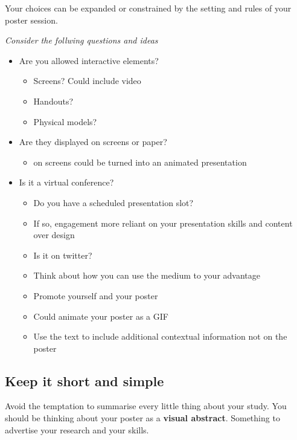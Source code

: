 \documentclass[
]{book}
\providecommand{\tightlist}{%
  \setlength{\itemsep}{0pt}\setlength{\parskip}{0pt}}
\begin{document}
Your choices can be expanded or constrained by the setting and rules of your poster session.

\emph{Consider the follwing questions and ideas}

\begin{itemize}
\tightlist
\item
  Are you allowed interactive elements?

  \begin{itemize}
  \tightlist
  \item
    Screens? Could include video
  \item
    Handouts?
  \item
    Physical models?
  \end{itemize}
\item
  Are they displayed on screens or paper?

  \begin{itemize}
  \tightlist
  \item
    on screens could be turned into an animated presentation
  \end{itemize}
\item
  Is it a virtual conference?

  \begin{itemize}
  \tightlist
  \item
    Do you have a scheduled presentation slot?
  \item
    If so, engagement more reliant on your presentation skills and content over design
  \item
    Is it on twitter?
  \item
    Think about how you can use the medium to your advantage
  \item
    Promote yourself and your poster
  \item
    Could animate your poster as a GIF
  \item
    Use the text to include additional contextual information not on the poster
  \end{itemize}
\end{itemize}

\hypertarget{keep-it-short-and-simple}{%
\subsection{Keep it short and simple}\label{keep-it-short-and-simple}}

Avoid the temptation to summarise every little thing about your study. You should be thinking about your poster as a \textbf{visual abstract}. Something to advertise your research and your skills.
\end{document}
